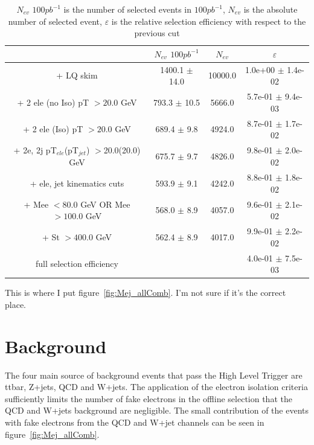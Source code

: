 \documentclass{cmspaper}
\begin{document}
\begin{table}[htbp]
\begin{center}
\begin{tabular}{|c|c|c|c|}
\hline
\hline
 & $N_{ev}$ $100pb^{-1}$ & $N_{ev}$ & $\varepsilon$ \\
\hline
\hline

+ LQ skim &1400.1 $\pm$ 14.0& 10000.0 & 1.0e+00 $\pm$ 1.4e-02\\
+ 2 ele (no Iso) pT $>20.0$ GeV &793.3 $\pm$ 10.5& 5666.0 & 5.7e-01 $\pm$ 9.4e-03\\
+ 2 ele (Iso) pT $>20.0$ GeV &689.4 $\pm$ 9.8& 4924.0 & 8.7e-01 $\pm$ 1.7e-02\\
+ 2e, 2j pT$_{ele}$(pT$_{jet}$) $>$20.0(20.0) GeV &675.7 $\pm$ 9.7& 4826.0 & 9.8e-01 $\pm$ 2.0e-02\\
+ ele, jet kinematics cuts &593.9 $\pm$ 9.1& 4242.0 & 8.8e-01 $\pm$ 1.8e-02\\
+ Mee $<80.0$ GeV OR Mee $>100.0$ GeV&568.0 $\pm$ 8.9& 4057.0 & 9.6e-01 $\pm$ 2.1e-02\\
+ St $>400.0$ GeV &562.4 $\pm$ 8.9& 4017.0 & 9.9e-01 $\pm$ 2.2e-02\\
\hline

full selection efficiency& &  & 4.0e-01 $\pm$ 7.5e-03\\
\hline
\end{tabular}
\end{center}
\caption{$N_{ev}$ $100pb^{-1}$ is the number of selected events in $100pb^{-1}$, $N_{ev}$ is the absolute number of selected event, $\varepsilon$ is the relative selection efficiency with respect to the previous cut}
\end{table}

This is where I put figure~\ref{fig:Mej_allComb}.  I'm not sure if it's the correct place.



\section{Background}
The four main source of background events that pass the High Level Trigger are ttbar, Z+jets, QCD and W+jets.  The application of the electron isolation criteria sufficiently limits the number of fake electrons in the offline selection that the QCD and W+jets background are negligible.  The small contribution of the events with fake electrons from the QCD and W+jet channels can be seen in figure~\ref{fig:Mej_allComb}.
\end{document}
